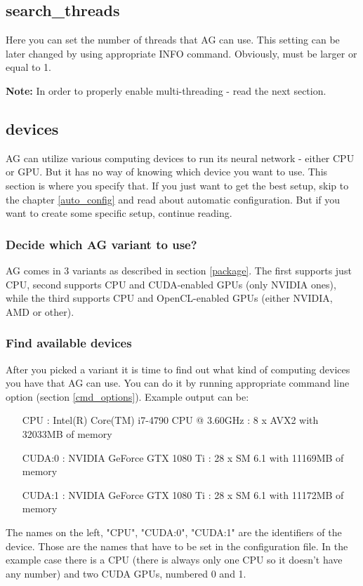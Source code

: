 \documentclass[12pt,a4paper]{article}
\begin{document}
\subsection{search{\_}threads}
Here you can set the number of threads that AG can use. This setting can be later changed by using appropriate INFO command. Obviously, must be larger or equal to 1.

\textbf{Note:} In order to properly enable multi-threading - read the next section.

\subsection{devices}
AG can utilize various computing devices to run its neural network - either CPU or GPU. But it has no way of knowing which device you want to use. This section is where you specify that. If you just want to get the best setup, skip to the chapter \ref{auto_config} and read about automatic configuration. But if you want to create some specific setup, continue reading.

\subsubsection{Decide which AG variant to use?}
AG comes in 3 variants as described in section \ref{package}. The first supports just CPU, second supports CPU and CUDA-enabled GPUs (only NVIDIA ones), while the third supports CPU and OpenCL-enabled GPUs (either NVIDIA, AMD or other).

\subsubsection{Find available devices}
After you picked a variant it is time to find out what kind of computing devices you have that AG can use. You can do it by running appropriate command line option (section \ref{cmd_options}). Example output can be:

\begin{enumerate}
\item[CPU]{ : Intel(R) Core(TM) i7-4790 CPU @ 3.60GHz : 8 x AVX2 with 32033MB of memory}
\item[CUDA:0]{ : NVIDIA GeForce GTX 1080 Ti : 28 x SM 6.1 with 11169MB of memory}
\item[CUDA:1]{ : NVIDIA GeForce GTX 1080 Ti : 28 x SM 6.1 with 11172MB of memory}
\end{enumerate}
The names on the left, "CPU", "CUDA:0", "CUDA:1" are the identifiers of the device. Those are the names that have to be set in the configuration file. In the example case there is a CPU (there is always only one CPU so it doesn't have any number) and two CUDA GPUs, numbered 0 and 1.
\end{document}
